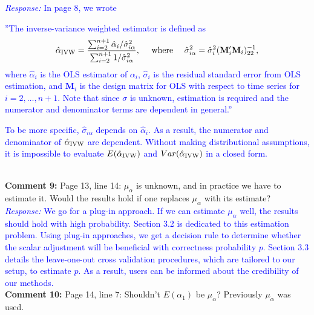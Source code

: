 \documentclass[12pt]{article}
\newcommand{\response}[1]{\noindent \textcolor{blue}{\emph{Response:} #1}}
\begin{document}
{\response{In page 8, we wrote \\
\begin{tcolorbox}
''The inverse-variance weighted estimator is defined as 
\begin{align*}
  \hat{\alpha}_{\rm IVW} = \frac{\sum_{i=2}^{n+1} \hat{\alpha}_i / \hat{\sigma}_{i\alpha}^2}{\sum_{i=2}^{n+1} 1/\hat{\sigma}_{i\alpha}^2},
  \quad \text{ where } \quad  \hat{\sigma}_{i\alpha}^2 = \hat{\sigma}^2_i( \mathbf{M}_i'\mathbf{M}_i)_{22}^{-1},
\end{align*}
where  $\hat{\alpha}_i$ is the OLS estimator of $\alpha_i$, 
$\hat{\sigma}_i$ is the residual standard error from OLS estimation, 
and $\mathbf{M}_i$ is the design matrix for OLS with respect to time series 
for $i = 2, \ldots, n+1$. Note that since $\sigma$ is unknown, estimation 
is required and the numerator and denominator terms are dependent in general.''
\end{tcolorbox}
To be more specific, $\hat{\sigma}_{i\alpha}$ depends on $\hat{\alpha}_i$. As a result, the numerator and denominator of $ \hat{\alpha}_{\rm IVW}$ are dependent. Without making distributional assumptions, it is impossible to evaluate $E(\hat{\alpha}_{\rm IVW})$ and $Var(\hat{\alpha}_{\rm IVW})$ in a closed form.}\\

{\bf Comment 9:} Page 13, line 14: $\mu_{\alpha}$ is unknown, and in practice we have to estimate it. Would the results hold if one replaces $\mu_{\alpha}$ with its estimate? \\

\response{We go for a plug-in approach. If we can estimate $\mu_{\alpha}$ well, the results should hold with high probability. Section 3.2 is dedicated to this estimation problem. Using plug-in approaches, we get a decision rule to determine whether the scalar adjustment will be beneficial with correctness probability $p$. Section 3.3 details the leave-one-out cross validation procedures, which are tailored to our setup, to estimate $p$. As a result, users can be informed about the credibility of our methods.} \\


{\bf Comment 10:} Page 14, line 7: Shouldn’t $E(\alpha_1)$ be $\mu_{\alpha}$? Previously $\mu_{\alpha}$ was used.\\

}
\end{document}
